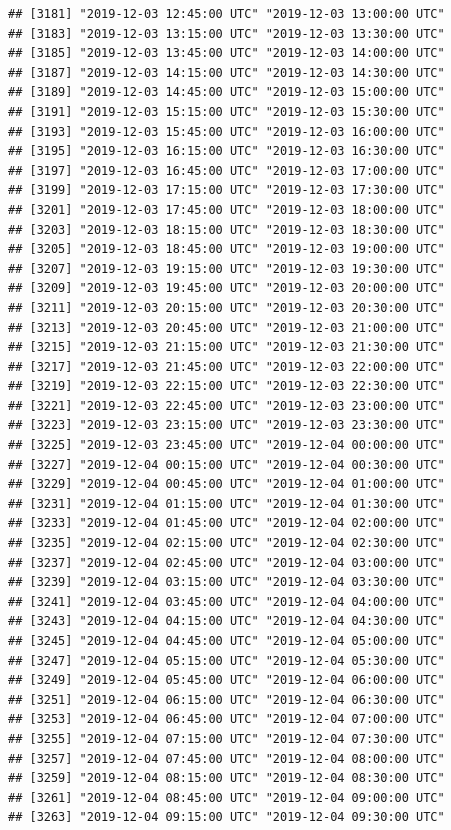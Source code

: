 \documentclass{article}\usepackage[]{graphicx}\usepackage[]{color}
\makeatletter
\newenvironment{kframe}{%
 \def\at@end@of@kframe{}%
 \ifinner\ifhmode%
  \def\at@end@of@kframe{\end{minipage}}%
  \begin{minipage}{\columnwidth}%
 \fi\fi%
 \def\FrameCommand##1{\hskip\@totalleftmargin \hskip-\fboxsep
 \colorbox{shadecolor}{##1}\hskip-\fboxsep
     \hskip-\linewidth \hskip-\@totalleftmargin \hskip\columnwidth}%
 \MakeFramed {\advance\hsize-\width
   \@totalleftmargin\z@ \linewidth\hsize
   \@setminipage}}%
 {\par\unskip\endMakeFramed%
 \at@end@of@kframe}
\newenvironment{knitrout}{}{} %
\makeatother
\begin{document}
\begin{knitrout}
\begin{kframe}
\begin{verbatim}
## [3181] "2019-12-03 12:45:00 UTC" "2019-12-03 13:00:00 UTC"
## [3183] "2019-12-03 13:15:00 UTC" "2019-12-03 13:30:00 UTC"
## [3185] "2019-12-03 13:45:00 UTC" "2019-12-03 14:00:00 UTC"
## [3187] "2019-12-03 14:15:00 UTC" "2019-12-03 14:30:00 UTC"
## [3189] "2019-12-03 14:45:00 UTC" "2019-12-03 15:00:00 UTC"
## [3191] "2019-12-03 15:15:00 UTC" "2019-12-03 15:30:00 UTC"
## [3193] "2019-12-03 15:45:00 UTC" "2019-12-03 16:00:00 UTC"
## [3195] "2019-12-03 16:15:00 UTC" "2019-12-03 16:30:00 UTC"
## [3197] "2019-12-03 16:45:00 UTC" "2019-12-03 17:00:00 UTC"
## [3199] "2019-12-03 17:15:00 UTC" "2019-12-03 17:30:00 UTC"
## [3201] "2019-12-03 17:45:00 UTC" "2019-12-03 18:00:00 UTC"
## [3203] "2019-12-03 18:15:00 UTC" "2019-12-03 18:30:00 UTC"
## [3205] "2019-12-03 18:45:00 UTC" "2019-12-03 19:00:00 UTC"
## [3207] "2019-12-03 19:15:00 UTC" "2019-12-03 19:30:00 UTC"
## [3209] "2019-12-03 19:45:00 UTC" "2019-12-03 20:00:00 UTC"
## [3211] "2019-12-03 20:15:00 UTC" "2019-12-03 20:30:00 UTC"
## [3213] "2019-12-03 20:45:00 UTC" "2019-12-03 21:00:00 UTC"
## [3215] "2019-12-03 21:15:00 UTC" "2019-12-03 21:30:00 UTC"
## [3217] "2019-12-03 21:45:00 UTC" "2019-12-03 22:00:00 UTC"
## [3219] "2019-12-03 22:15:00 UTC" "2019-12-03 22:30:00 UTC"
## [3221] "2019-12-03 22:45:00 UTC" "2019-12-03 23:00:00 UTC"
## [3223] "2019-12-03 23:15:00 UTC" "2019-12-03 23:30:00 UTC"
## [3225] "2019-12-03 23:45:00 UTC" "2019-12-04 00:00:00 UTC"
## [3227] "2019-12-04 00:15:00 UTC" "2019-12-04 00:30:00 UTC"
## [3229] "2019-12-04 00:45:00 UTC" "2019-12-04 01:00:00 UTC"
## [3231] "2019-12-04 01:15:00 UTC" "2019-12-04 01:30:00 UTC"
## [3233] "2019-12-04 01:45:00 UTC" "2019-12-04 02:00:00 UTC"
## [3235] "2019-12-04 02:15:00 UTC" "2019-12-04 02:30:00 UTC"
## [3237] "2019-12-04 02:45:00 UTC" "2019-12-04 03:00:00 UTC"
## [3239] "2019-12-04 03:15:00 UTC" "2019-12-04 03:30:00 UTC"
## [3241] "2019-12-04 03:45:00 UTC" "2019-12-04 04:00:00 UTC"
## [3243] "2019-12-04 04:15:00 UTC" "2019-12-04 04:30:00 UTC"
## [3245] "2019-12-04 04:45:00 UTC" "2019-12-04 05:00:00 UTC"
## [3247] "2019-12-04 05:15:00 UTC" "2019-12-04 05:30:00 UTC"
## [3249] "2019-12-04 05:45:00 UTC" "2019-12-04 06:00:00 UTC"
## [3251] "2019-12-04 06:15:00 UTC" "2019-12-04 06:30:00 UTC"
## [3253] "2019-12-04 06:45:00 UTC" "2019-12-04 07:00:00 UTC"
## [3255] "2019-12-04 07:15:00 UTC" "2019-12-04 07:30:00 UTC"
## [3257] "2019-12-04 07:45:00 UTC" "2019-12-04 08:00:00 UTC"
## [3259] "2019-12-04 08:15:00 UTC" "2019-12-04 08:30:00 UTC"
## [3261] "2019-12-04 08:45:00 UTC" "2019-12-04 09:00:00 UTC"
## [3263] "2019-12-04 09:15:00 UTC" "2019-12-04 09:30:00 UTC"

\end{verbatim}
\end{kframe}
\end{knitrout}
\end{document}
